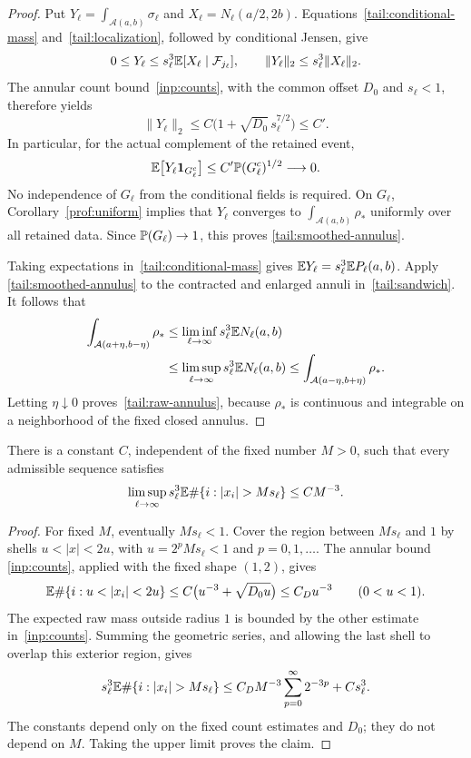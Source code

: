 \begin{proof}
Put $Y_\ell=\int_{\mathcal A(a,b)}\sigma_\ell$ and
$X_\ell=N_\ell(a/2,2b)$. Equations~\eqref{tail:conditional-mass}
and~\eqref{tail:localization}, followed by conditional Jensen, give
\[
 0\le Y_\ell\le s_\ell^3\mathbb E[X_\ell\mid\mathcal F_{j_\ell}],
 \qquad
 \|Y_\ell\|_2\le s_\ell^3\|X_\ell\|_2.
\]
The annular count bound~\eqref{inp:counts}, with the common offset
$D_0$ and $s_\ell<1$, therefore yields
\begin{equation}\label{tail:uniform-integrability}
 \|Y_\ell\|_2
 \le C\bigl(1+\sqrt{D_0}\,s_\ell^{7/2}\bigr)\le C'.
\end{equation}
In particular, for the actual complement of the retained event,
\[
 \mathbb E\bigl[Y_\ell\mathbf1_{G_\ell^c}\bigr]
       \le C'\mathbb P(G_\ell^c)^{1/2}\longrightarrow0.
\]
No independence of $G_\ell$ from the conditional fields is required.
On $G_\ell$, Corollary~\ref{prof:uniform} implies that $Y_\ell$
converges to $\int_{\mathcal A(a,b)}\rho_*$ uniformly over all retained
data. Since $\mathbb P(G_\ell)\to1$, this proves
\eqref{tail:smoothed-annulus}.

Taking expectations in~\eqref{tail:conditional-mass} gives
$\mathbb E Y_\ell=s_\ell^3\mathbb E P_\ell(a,b)$. Apply
\eqref{tail:smoothed-annulus} to the contracted and enlarged annuli
in~\eqref{tail:sandwich}. It follows that
\begin{align*}
 \int_{\mathcal A(a+\eta,b-\eta)}\rho_*
  &\le \liminf_{\ell\to\infty}s_\ell^3\mathbb E N_\ell(a,b)\\
  &\le \limsup_{\ell\to\infty}s_\ell^3\mathbb E N_\ell(a,b)
   \le \int_{\mathcal A(a-\eta,b+\eta)}\rho_*.
\end{align*}
Letting $\eta\downarrow0$ proves~\eqref{tail:raw-annulus}, because
$\rho_*$ is continuous and integrable on a neighborhood of the fixed
closed annulus.
\end{proof}

\begin{lemma}\label{tail:tightness}
There is a constant $C$, independent of the fixed number $M>0$, such
that every admissible sequence satisfies
\begin{equation}\label{tail:tightness-bound}
 \limsup_{\ell\to\infty}s_\ell^3
      \E\#\{i:|x_i|>Ms_\ell\}\le CM^{-3}.
\end{equation}
\end{lemma}

\begin{proof}
For fixed $M$, eventually $Ms_\ell<1$. Cover the region between
$Ms_\ell$ and $1$ by shells $u<|x|<2u$, with
$u=2^pMs_\ell<1$ and $p=0,1,\ldots$. The annular bound
\eqref{inp:counts}, applied with the fixed shape $(1,2)$, gives
\[
 \E\#\{i:u<|x_i|<2u\}
 \le C\bigl(u^{-3}+\sqrt{D_0u}\bigr)\le C_Du^{-3}
 \qquad(0<u<1).
\]
The expected raw mass outside radius $1$ is bounded by the other
estimate in~\eqref{inp:counts}. Summing the geometric series, and
allowing the last shell to overlap this exterior region, gives
\[
 s_\ell^3\E\#\{i:|x_i|>Ms_\ell\}
 \le C_D M^{-3}\sum_{p=0}^{\infty}2^{-3p}+Cs_\ell^3.
\]
The constants depend only on the fixed count estimates and $D_0$;
they do not depend on $M$. Taking the upper limit proves the claim.
\end{proof}

